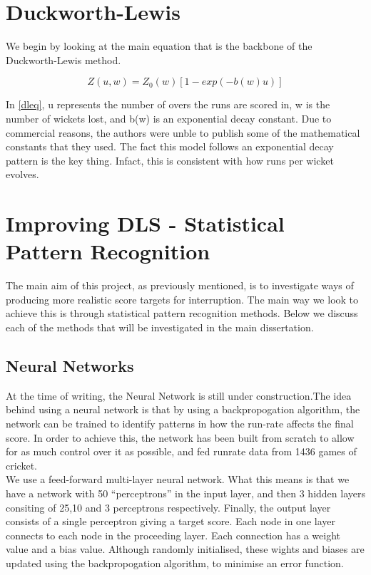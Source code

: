 \documentclass[11pt]{amsart}
\begin{document}
\section{Duckworth-Lewis}
We begin by looking at the main equation that is the backbone of the Duckworth-Lewis method.

\begin{equation}
    \label{dleq}
    Z(u,w) = Z_0(w)[1-exp(-b(w)u)]
\end{equation}

In \ref{dleq}, u represents the number of overs the runs are scored in, w is the number of wickets lost, and b(w) is an exponential decay constant.
Due to commercial reasons, the authors were unble to publish some of the mathematical constants that they used. The fact this model follows an exponential decay 
pattern is the key thing. Infact, this is consistent with how runs per wicket evolves.


\section{Improving DLS - Statistical Pattern Recognition}

The main aim of this project, as previously mentioned, is to investigate ways of producing more realistic score targets for interruption. The main way we look to 
achieve this is through statistical pattern recognition methods. Below we discuss each of the methods that will be investigated in the main dissertation.

\subsection{Neural Networks}
At the time of writing, the Neural Network is still under construction.The idea behind using a neural network is that by using a backpropogation algorithm,
the network can be trained to identify patterns in how the run-rate affects the final score. In order to achieve this, the network has been built from scratch
to allow for as much control over it as possible, and fed runrate data from 1436 games of cricket. \\

We use a feed-forward multi-layer neural network. What this means is that we have a network with 50 ``perceptrons'' in the input layer,
and then 3 hidden layers consiting of 25,10 and 3 perceptrons respectively. Finally, the output layer consists of a single perceptron giving a target score.
Each node in one layer connects to each node in the proceeding layer. Each connection has a weight value and a bias value. Although randomly initialised,
these wights and biases are updated using the backpropogation algorithm, to minimise an error function. \\
\end{document}
